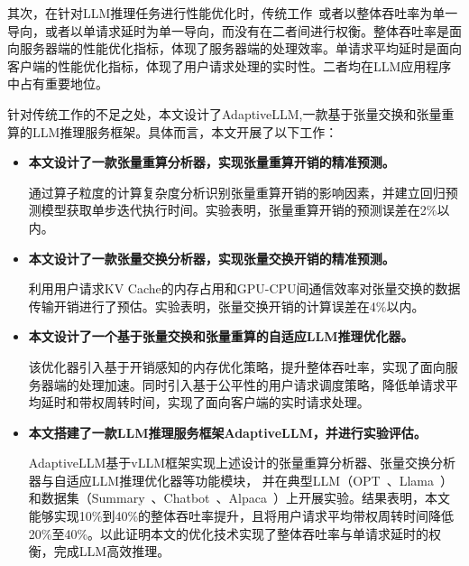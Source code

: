 其次，在针对LLM推理任务进行性能优化时，传统工作~\cite{Swapping, vLLM, SpecInfer}或者以整体吞吐率为单一导向，或者以单请求延时为单一导向，而没有在二者间进行权衡。整体吞吐率是面向服务器端的性能优化指标，体现了服务器端的处理效率。单请求平均延时是面向客户端的性能优化指标，体现了用户请求处理的实时性。二者均在LLM应用程序中占有重要地位。

针对传统工作的不足之处，本文设计了AdaptiveLLM,一款基于张量交换和张量重算的LLM推理服务框架。具体而言，本文开展了以下工作：

\begin{itemize} 
    
    \item \textbf{本文设计了一款张量重算分析器，实现张量重算开销的精准预测。}     
    \setlength{\parindent}{2em} \par    
    通过算子粒度的计算复杂度分析识别张量重算开销的影响因素，并建立回归预测模型获取单步迭代执行时间。实验表明，张量重算开销的预测误差在2\%以内。
    
    \item \textbf{本文设计了一款张量交换分析器，实现张量交换开销的精准预测。}    
    \setlength{\parindent}{2em} \par    
    利用用户请求KV Cache的内存占用和GPU-CPU间通信效率对张量交换的数据传输开销进行了预估。实验表明，张量交换开销的计算误差在4\%以内。

    \item \textbf{本文设计了一个基于张量交换和张量重算的自适应LLM推理优化器。}    
    \setlength{\parindent}{2em} \par    
    该优化器引入基于开销感知的内存优化策略，提升整体吞吐率，实现了面向服务器端的处理加速。同时引入基于公平性的用户请求调度策略，降低单请求平均延时和带权周转时间，实现了面向客户端的实时请求处理。
    
    \item \textbf{本文搭建了一款LLM推理服务框架AdaptiveLLM，并进行实验评估。}    
    \setlength{\parindent}{2em} \par  
    AdaptiveLLM基于vLLM框架实现上述设计的张量重算分析器、张量交换分析器与自适应LLM推理优化器等功能模块， 并在典型LLM（OPT~\cite{OPT}、Llama~\cite{Llama}）和数据集（Summary~\cite{Summary}、Chatbot~\cite{Chatbot}、Alpaca~\cite{Alpaca}）上开展实验。结果表明，本文能够实现10\%到40\%的整体吞吐率提升，且将用户请求平均带权周转时间降低20\%至40\%。以此证明本文的优化技术实现了整体吞吐率与单请求延时的权衡，完成LLM高效推理。

\end{itemize}